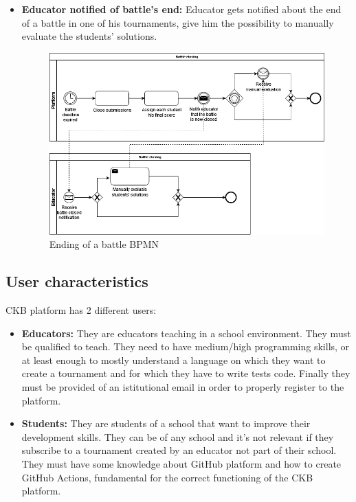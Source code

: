\documentclass{article}
\begin{document}
{\begin{itemize}
    \item \textbf{Educator notified of battle's end:} Educator gets notified about the end of a battle in one of his tournaments, give him the possibility to manually evaluate the students' solutions.
          \begin{figure}[H]
              \centering
              \includegraphics[scale=0.35]{images/BPMN/BPMN12.png}
              \caption{Ending of a battle BPMN}
              \label{fig:battleEndingBPMN}
          \end{figure}
\end{itemize}

\subsection{User characteristics}
CKB platform has 2 different users:
\begin{itemize}
    \item \textbf{Educators:} They are educators teaching in a school
          environment. They must be qualified to teach. They need to have
          medium/high programming skills, or at least enough to mostly
          understand a language on which they want to create a tournament and
          for which they have to write tests code.
          Finally they must be provided of an istitutional email in order to properly
          register to the platform.
    \item \textbf{Students:} They are students of a school that want to
          improve their development skills. They can be of any school and it's
          not relevant if they subscribe to a tournament created by an educator
          not part of their school. They must have some knowledge about GitHub
          platform and how to create GitHub Actions, fundamental for the correct
          functioning of the CKB platform.
\end{itemize}

}
\end{document}
